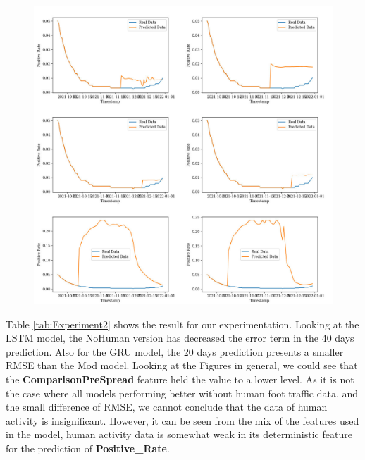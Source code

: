 \begin{figure}[!ht]
    \centering
    \includegraphics[width=16cm]{images/DeepLearning_NoHuman.jpg}
    \label{fig:DL_NoHuman}
\end{figure}

Table \ref{tab:Experiment2} shows the result for our experimentation. Looking at the LSTM model, the NoHuman version has decreased the error term in the 40 days prediction. Also for the GRU model, the 20 days prediction presents a smaller RMSE than the Mod model. Looking at the Figures in general, we could see that the \textbf{ComparisonPreSpread} feature held the value to a lower level. As it is not the case where all models performing better without human foot traffic data, and the small difference of RMSE, we cannot conclude that the data of human activity is insignificant. However, it can be seen from the mix of the features used in the model, human activity data is somewhat weak in its deterministic feature for the prediction of \textbf{Positive\_Rate}. 
